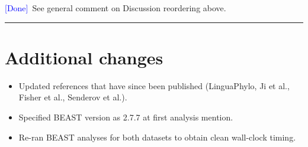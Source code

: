 \documentclass[11pt]{article}
\newcommand{\response}[1]{\noindent #1\medskip}
\newcommand{\done}{\textcolor{blue}{[Done]}}
\begin{document}
\response{\done\ See general comment on Discussion reordering above.}

\bigskip
\hrule
\bigskip

\section*{Additional changes}

\begin{itemize}[nosep]
  \item Updated references that have since been published (LinguaPhylo, Ji et al., Fisher et al., Senderov et al.).
  \item Specified BEAST version as 2.7.7 at first analysis mention.
  \item Re-ran BEAST analyses for both datasets to obtain clean wall-clock timing.
\end{itemize}
\end{document}
